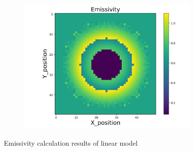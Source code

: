 \begin{figure}[p]
\begin{minipage}{\textwidth}
\begin{subfigure}{0.325\textwidth}
            \centering
            \includegraphics[width=\textwidth]{figures/raw_data/33/linear/emi_cal.jpg}
        \end{subfigure}
    \end{minipage}
    \caption{Emissivity calculation results of linear model}  
\end{figure}


\newpage
